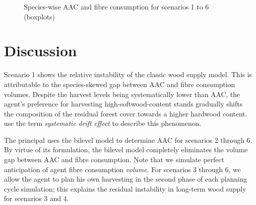 \begin{figure}%
  \ContinuedFloat
  \centering
  \caption{Species-wise AAC and fibre consumption for scenarios 1 to 6 (boxplots)}%
\end{figure}



\section{Discussion}
Scenario 1 shows the relative instability of the classic wood supply model. This is attributable to the species-skewed gap between AAC and fibre consumption volumes. Despite the harvest levels being systematically lower than AAC, the agent's preference for harvesting high-softwood-content stands gradually shifts the composition of the residual forest cover towards a higher hardwood content. \citet{paradis2013risk} use the term \emph{systematic drift effect} to describe this phenomenon.   

The principal uses the bilevel model to determine AAC for scenarios 2 through 6. By virtue of its formulation, the bilevel model completely eliminates the volume gap between AAC and fibre consumption. Note that we simulate perfect anticipation of agent fibre consumption \emph{volume}. For scenarios 3 through 6, we allow the agent to plan his own harvesting in the second phase of each planning cycle simulation; this explains the residual instability in long-term wood supply for scenarios 3 and 4.

